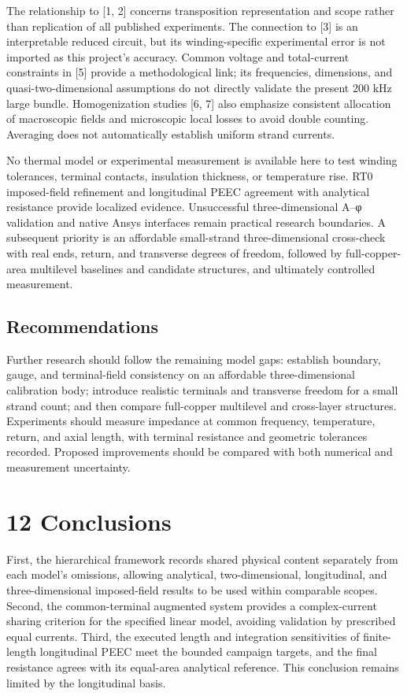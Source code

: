 \documentclass[journal,10pt]{IEEEtran}
\begin{document}
The relationship to [1, 2] concerns transposition representation and scope rather than replication of all published experiments. The connection to [3] is an interpretable reduced circuit, but its winding-specific experimental error is not imported as this project’s accuracy. Common voltage and total-current constraints in [5] provide a methodological link; its frequencies, dimensions, and quasi-two-dimensional assumptions do not directly validate the present 200 kHz large bundle. Homogenization studies [6, 7] also emphasize consistent allocation of macroscopic fields and microscopic local losses to avoid double counting. Averaging does not automatically establish uniform strand currents.


No thermal model or experimental measurement is available here to test winding tolerances, terminal contacts, insulation thickness, or temperature rise. RT0 imposed-field refinement and longitudinal PEEC agreement with analytical resistance provide localized evidence. Unsuccessful three-dimensional A–φ validation and native Ansys interfaces remain practical research boundaries. A subsequent priority is an affordable small-strand three-dimensional cross-check with real ends, return, and transverse degrees of freedom, followed by full-copper-area multilevel baselines and candidate structures, and ultimately controlled measurement.


\subsection*{Recommendations}
\hypertarget{11.recommendations.heading}{}
Further research should follow the remaining model gaps: establish boundary, gauge, and terminal-field consistency on an affordable three-dimensional calibration body; introduce realistic terminals and transverse freedom for a small strand count; and then compare full-copper multilevel and cross-layer structures. Experiments should measure impedance at common frequency, temperature, return, and axial length, with terminal resistance and geometric tolerances recorded. Proposed improvements should be compared with both numerical and measurement uncertainty.


\FloatBarrier
\section*{12 Conclusions}
\hypertarget{chapter-12}{}
First, the hierarchical framework records shared physical content separately from each model’s omissions, allowing analytical, two-dimensional, longitudinal, and three-dimensional imposed-field results to be used within comparable scopes. Second, the common-terminal augmented system provides a complex-current sharing criterion for the specified linear model, avoiding validation by prescribed equal currents. Third, the executed length and integration sensitivities of finite-length longitudinal PEEC meet the bounded campaign targets, and the final resistance agrees with its equal-area analytical reference. This conclusion remains limited by the longitudinal basis.
\end{document}
